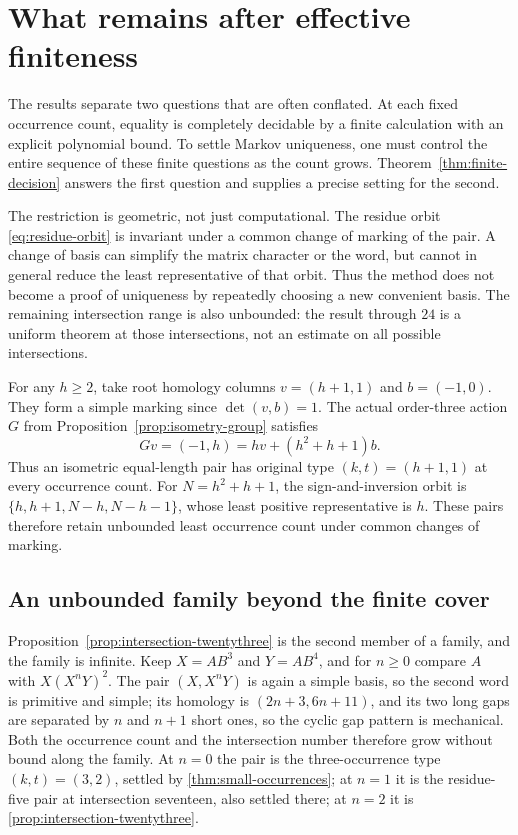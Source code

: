 \section{What remains after effective finiteness}
\label{sec:outlook}

The results separate two questions that are often conflated. At each
fixed occurrence count, equality is completely decidable by a finite
calculation with an explicit polynomial bound. To settle Markov
uniqueness, one must control the entire sequence of these finite
questions as the count grows. Theorem~\ref{thm:finite-decision} answers
the first question and supplies a precise setting for the second.

The restriction is geometric, not just computational. The residue orbit
\eqref{eq:residue-orbit} is invariant under a common change of marking
of the pair. A change of basis can simplify the matrix character or the
word, but cannot in general reduce the least representative of that
orbit. Thus the method does not become a proof of uniqueness by
repeatedly choosing a new convenient basis. The remaining intersection
range is also unbounded: the result through $24$ is a uniform theorem
at those intersections, not an estimate on all possible intersections.

\begin{example}
\label{ex:unbounded-isometric-family}
For any $h\geqslant2$, take root homology columns
$v=(h+1,1)$ and $b=(-1,0)$. They form a simple marking since
$\det(v,b)=1$. The actual order-three action $G$ from
Proposition~\ref{prop:isometry-group} satisfies
$$
 Gv=(-1,h)=hv+(h^2+h+1)b.
$$
Thus an isometric equal-length pair has original type
$(k,t)=(h+1,1)$ at every occurrence count. For
$N=h^2+h+1$, the sign-and-inversion orbit is
$\{h,h+1,N-h,N-h-1\}$, whose least positive representative is $h$.
These pairs therefore retain unbounded least occurrence count under
common changes of marking.
\end{example}

\subsection{An unbounded family beyond the finite cover}

Proposition~\ref{prop:intersection-twentythree} is the second member of a
family, and the family is infinite. Keep $X=AB^3$ and $Y=AB^4$, and for
$n\geqslant0$ compare $A$ with $X(X^nY)^2$. The pair $(X,X^nY)$ is again a
simple basis, so the second word is primitive and simple; its homology is
$(2n+3,6n+11)$, and its two long gaps are separated by $n$ and $n+1$ short
ones, so the cyclic gap pattern is mechanical. Both the occurrence count and
the intersection number therefore grow without bound along the family. At
$n=0$ the pair is the three-occurrence type $(k,t)=(3,2)$, settled by
\cref{thm:small-occurrences}; at $n=1$ it is the residue-five pair at
intersection seventeen, also settled there; at $n=2$ it is
\cref{prop:intersection-twentythree}.


